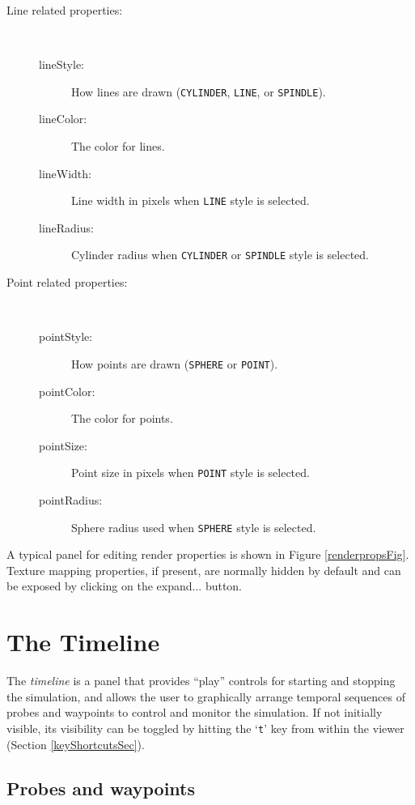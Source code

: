 \documentclass{article}
\begin{document}
\begin{description}
\item[Line related properties:]
\hfil \\
\begin{description}
\item[lineStyle:] 
How lines are drawn ({\tt CYLINDER}, {\tt LINE}, or {\tt SPINDLE}).
\item[lineColor:]
The color for lines.
\item[lineWidth:]
Line width in pixels when {\tt LINE} style is selected.
\item[lineRadius:]
Cylinder radius when {\tt CYLINDER} or {\tt SPINDLE} style is selected.
\end{description}

\item[Point related properties:]
\hfil \\
\begin{description}
\item[pointStyle:] 
How points are drawn ({\tt SPHERE} or {\tt POINT}).
\item[pointColor:] 
The color for points.
\item[pointSize:] 
Point size in pixels when {\tt POINT} style is selected.
\item[pointRadius:] 	
Sphere radius used when {\tt SPHERE} style is selected.
\end{description}

\end{description}

A typical panel for editing render properties is shown in Figure
\ref{renderpropsFig}. Texture mapping properties, if present, are
normally hidden by default and can be exposed by clicking on the {\sf
expand...} button.

\section{The Timeline}
\label{TimelineSec}

The {\it timeline} is a panel that provides ``play'' controls for
starting and stopping the simulation, and allows the user to
graphically arrange temporal sequences of probes and waypoints to
control and monitor the simulation. If not initially visible, its
visibility can be toggled by hitting the `{\tt t}' key from within the
viewer (Section \ref{keyShortcutsSec}).

\subsection{Probes and waypoints}
\label{ProbesAndWaypoints:sec}
\end{document}
